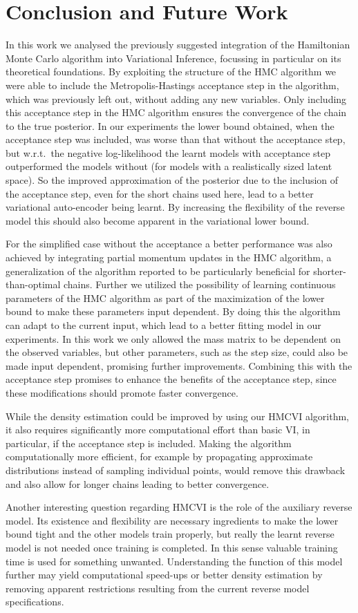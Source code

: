 \section{Conclusion and Future Work}
\label{sec:ConclAndFuture}
In this work we analysed the previously suggested integration of the Hamiltonian Monte Carlo algorithm into Variational Inference, focussing in particular on its theoretical foundations. By exploiting the structure of the HMC algorithm we were able to include the Metropolis-Hastings acceptance step in the algorithm, which was previously left out, without adding any new variables. Only including this acceptance step in the HMC algorithm ensures the convergence of the chain to the true posterior. In our experiments the lower bound obtained, when the acceptance step was included, was worse than that without the acceptance step, but w.r.t.\ the negative log-likelihood the learnt models with acceptance step outperformed the models without (for models with a realistically sized latent space). So the improved approximation of the posterior due to the inclusion of the acceptance step, even for the short chains used here, lead to a better variational auto-encoder being learnt. By increasing the flexibility of the reverse model this should also become apparent in the variational lower bound.

For the simplified case without the acceptance a better performance was also achieved by integrating partial momentum updates in the HMC algorithm, a generalization of the algorithm reported to be particularly beneficial for shorter-than-optimal chains. Further we utilized the possibility of learning continuous parameters of the HMC algorithm as part of the maximization of the lower bound to make these parameters input dependent. By doing this the algorithm can adapt to the current input, which lead to a better fitting model in our experiments. In this work we only allowed the mass matrix to be dependent on the observed variables, but other parameters, such as the step size, could also be made input dependent, promising further improvements. Combining this with the acceptance step promises to enhance the benefits of the acceptance step, since these modifications should promote faster convergence.

While the density estimation could be improved by using our HMCVI algorithm, it also requires significantly more computational effort than basic VI, in particular, if the acceptance step is included. Making the algorithm computationally more efficient, for example by propagating approximate distributions instead of sampling individual points, would remove this drawback and also allow for longer chains leading to better convergence.

Another interesting question regarding HMCVI is the role of the auxiliary reverse model. Its existence and flexibility are necessary ingredients to make the lower bound tight and the other models train properly, but really the learnt reverse model is not needed once training is completed. In this sense valuable training time is used for something unwanted. Understanding the function of this model further may yield computational speed-ups or better density estimation by removing apparent restrictions resulting from the current reverse model specifications.